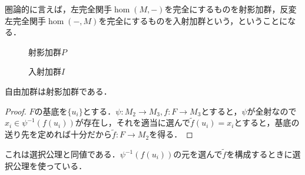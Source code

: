 圏論的に言えば，左完全関手$\hom(M,-)$を完全にするものを射影加群，反変左完全関手$\hom(-,M)$を完全にするものを入射加群という，ということになる．

\begin{minipage}{.45\hsize}
	\begin{figure}[H]
		\centering
		\caption{射影加群$P$}
	\end{figure}
\end{minipage}
\hfill
\begin{minipage}{.45\hsize}
	\begin{figure}[H]
		\centering
		\caption{入射加群$I$}
	\end{figure}
\end{minipage}

\begin{prop}\label{prop:自由加群は射影加群}
	自由加群は射影加群である．
\end{prop}
\begin{proof}
	$F$の基底を$\{u_i\}$とする．$\psi:M_2\to M_3,f:F\to M_3$とすると，$\psi$が全射なので$x_i\in\psi^{-1}(f(u_i))$が存在し，それを適当に選んで$\widetilde{f}(u_i)=x_i$とすると，基底の送り先を定めれば十分だから$\widetilde{f}:F\to M_2$を得る．
\end{proof}

これは選択公理と同値である．$\psi^{-1}(f(u_i))$の元を選んで$\widetilde{f}$を構成するときに選択公理を使っている．

